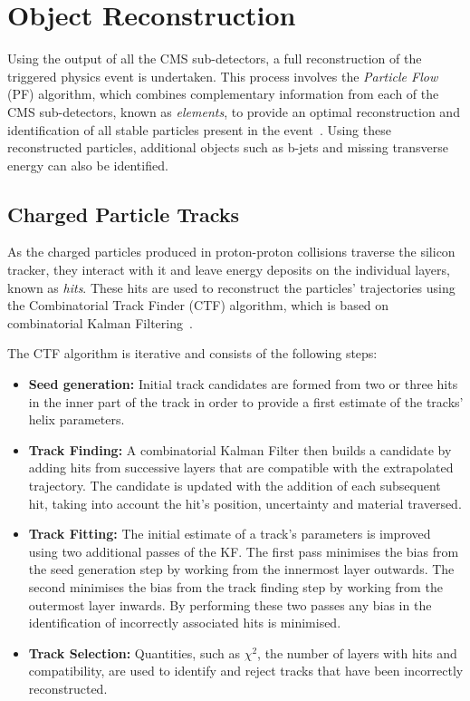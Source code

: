 \section{Object Reconstruction}\label{sec:reco}
Using the output of all the CMS sub-detectors, a full reconstruction of the triggered physics event is undertaken.
This process involves the \emph{Particle Flow} (PF) algorithm, which combines complementary information from each of the CMS sub-detectors, known as \emph{elements}, to provide an optimal reconstruction and identification of all stable particles present in the event~\cite{CMS:2009nxa,CMS:2010eua,CMS-PRF-14-001}.
Using these reconstructed particles, additional objects such as b-jets and missing transverse energy can also be identified.

\subsection{Charged Particle Tracks}\label{subsec:tracks}
As the charged particles produced in proton-proton collisions traverse the silicon tracker, they interact with it and leave energy deposits on the individual layers, known as \emph{hits}.
These hits are used to reconstruct the particles' trajectories using the Combinatorial Track Finder (CTF) algorithm, which is based on combinatorial Kalman Filtering~\cite{Chatrchyan:2014fea,Fruhwirth:1987fm}.

The CTF algorithm is iterative and consists of the following steps:
\begin{itemize}
\item \textbf{Seed generation:} Initial track candidates are formed from two or three hits in the inner part of the track in order to provide a first estimate of the tracks' helix parameters.
\item \textbf{Track Finding:} A combinatorial Kalman Filter then builds a candidate by adding hits from successive layers that are compatible with the extrapolated trajectory. The candidate is updated with the addition of each subsequent hit, taking into account the hit's position, uncertainty and material traversed.
\item \textbf{Track Fitting:} The initial estimate of a track's parameters is improved using two additional passes of the KF.
The first pass minimises the bias from the seed generation step by working from the innermost layer outwards.
The second minimises the bias from the track finding step by working from the outermost layer inwards.
By performing these two passes any bias in the identification of incorrectly associated hits is minimised.
\item \textbf{Track Selection:} Quantities, such as $\chi^{2}$, the number of layers with hits and compatibility, are used to identify and reject tracks that have been incorrectly reconstructed.
\end{itemize}

